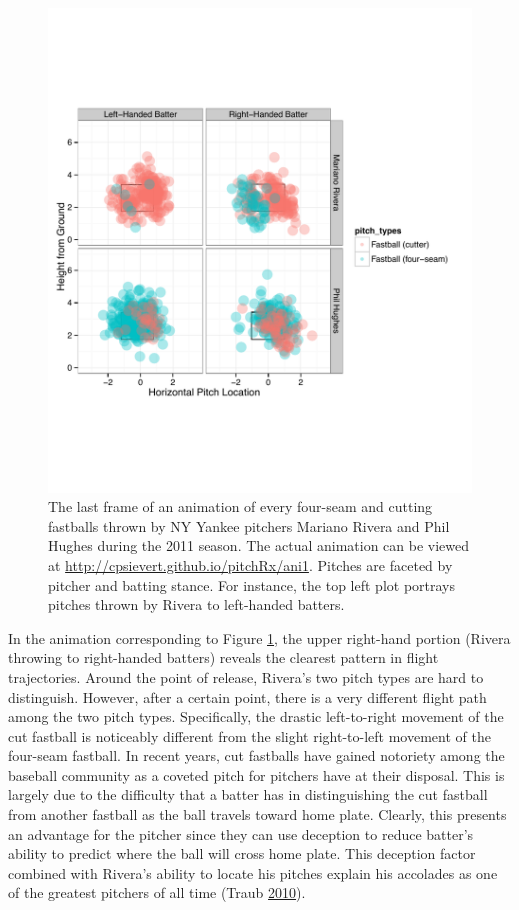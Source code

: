 \documentclass[12pt,]{isuthesis}
\begin{document}
\begin{figure}[htbp]
\centering
\includegraphics{images/ani-frame1.pdf}
\caption{\label{fig:animate1}The last frame of an animation of every
four-seam and cutting fastballs thrown by NY Yankee pitchers Mariano
Rivera and Phil Hughes during the 2011 season. The actual animation can
be viewed at \url{http://cpsievert.github.io/pitchRx/ani1}. Pitches are
faceted by pitcher and batting stance. For instance, the top left plot
portrays pitches thrown by Rivera to left-handed batters.}
\end{figure}

In the animation corresponding to Figure \ref{fig:animate1}, the upper
right-hand portion (Rivera throwing to right-handed batters) reveals the
clearest pattern in flight trajectories. Around the point of release,
Rivera's two pitch types are hard to distinguish. However, after a
certain point, there is a very different flight path among the two pitch
types. Specifically, the drastic left-to-right movement of the cut
fastball is noticeably different from the slight right-to-left movement
of the four-seam fastball. In recent years, cut fastballs have gained
notoriety among the baseball community as a coveted pitch for pitchers
have at their disposal. This is largely due to the difficulty that a
batter has in distinguishing the cut fastball from another fastball as
the ball travels toward home plate. Clearly, this presents an advantage
for the pitcher since they can use deception to reduce batter's ability
to predict where the ball will cross home plate. This deception factor
combined with Rivera's ability to locate his pitches explain his
accolades as one of the greatest pitchers of all time (Traub
\protect\hyperlink{ref-NYT}{2010}).
\end{document}
